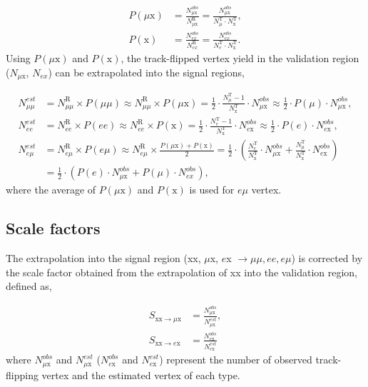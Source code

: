 \begin{align}
P(\mu\mathrm{x}) &= \frac{N_{\mu\mathrm{x}}^{obs}}{N^{\mathrm{R}}_{\mu\mathrm{x}}} = \frac{N_{\mu\mathrm{x}}^{obs}}{N^{\mathrm{T}}_{\mu} \cdot N^{\mathrm{T}}_{\mathrm{x}}}, \nonumber\\
P(\mathrm{x}) &= \frac{N_{ex}^{obs}}{N^{\mathrm{R}}_{ex}} = \frac{N_{ex}^{obs}}{N^{\mathrm{T}}_{e} \cdot N^{\mathrm{T}}_{\mathrm{x}}}.
\end{align}
%
Using $P(\mu\mathrm{x})$ and $P(\mathrm{x})$, the track-flipped vertex yield in the validation region ($N_{\mu\mathrm{x}}$, $N_{ex}$) can be extrapolated into the signal regions,

\begin{align}
\label{eq:TF_extrapolation_from_validation}
N_{\mu\mu}^{est}&= N^{\mathrm{R}}_{\mu\mu} \times P(\mu\mu) \approx N^{\mathrm{R}}_{\mu\mu} \times P(\mu\mathrm{x})  = \frac{1}{2} \cdot \frac{N^{\mathrm{T}}_{\mu}-1}{N^{\mathrm{T}}_{\mathrm{x}}} \cdot N_{\mu\mathrm{x}}^{obs} \approx \frac{1}{2} \cdot P(\mu) \cdot N_{\mu\mathrm{x}}^{obs}, \nonumber \\
N_{ee}^{est}    &= N^{\mathrm{R}}_{ee} \times P(ee) \approx N^{\mathrm{R}}_{ee} \times P(\mathrm{x}) = \frac{1}{2} \cdot \frac{N^{\mathrm{T}}_{e}-1}{N^{\mathrm{T}}_{\mathrm{x}}} \cdot N_{e \mathrm{x}}^{obs} \approx \frac{1}{2} \cdot P(e) \cdot N_{e \mathrm{x}}^{obs}, \nonumber \\
N_{e \mu}^{est} &= N^{\mathrm{R}}_{e \mu} \times P(e \mu) \approx N^{\mathrm{R}}_{e \mu} \times \frac{P(\mu\mathrm{x}) + P(\mathrm{x})}{2} = \frac{1}{2} \cdot (\frac{N^{\mathrm{T}}_{e}}{N^{\mathrm{T}}_{\mathrm{x}}} \cdot N_{\mu\mathrm{x}}^{obs} + \frac{N^{\mathrm{T}}_{\mu}}{N^{\mathrm{T}}_{\mathrm{x}}} \cdot N_{e \mathrm{x}}^{obs}) \nonumber \\
&= \frac{1}{2} \cdot (P(e) \cdot N_{\mu\mathrm{x}}^{obs} + P(\mu) \cdot N_{ex}^{obs}),
\end{align}
%
where the average of $P(\mu\mathrm{x})$ and $P(\mathrm{x})$ is used for $e \mu$ vertex.


\subsection{Scale factors}

The extrapolation into the signal region (xx, $\mu$x, $e$x $\rightarrow \mu\mu, ee, e\mu$) is corrected by the scale factor obtained from the extrapolation of xx into the validation region, defined as,

\begin{align}
    S_{\mathrm{xx}\rightarrow \mu \mathrm{x}} &= \frac{N_{\mu \mathrm{x}}^{obs}}{N_{\mu \mathrm{x}}^{est}}, \nonumber \\
    S_{\mathrm{xx}\rightarrow e\mathrm{x}}   &= \frac{N_{e\mathrm{x}}^{obs}}{ N_{e\mathrm{x}}^{est}}
\label{eq:random_crossing_scale_factor}
\end{align}
where $N_{\mu \mathrm{x}}^{obs}$ and $N_{\mu \mathrm{x}}^{est}$ ($N_{e\mathrm{x}}^{obs}$ and $N_{e\mathrm{x}}^{est}$) represent the number of observed track-flipping vertex and the estimated vertex of each type.

